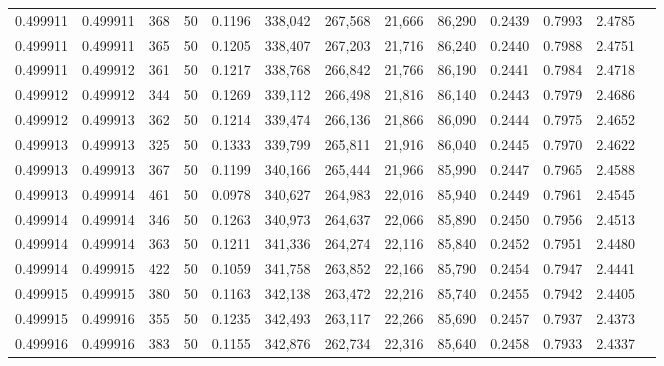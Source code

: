 \begin{tabular}{rrrrrrrrrrrrr}
0.499911 & 0.499911 &   368 &  50 &                                     0.1196 & 338,042 & 267,568 &  21,666 &  86,290 & 0.2439 & 0.7993 & 2.4785 \\
0.499911 & 0.499911 &   365 &  50 &                                     0.1205 & 338,407 & 267,203 &  21,716 &  86,240 & 0.2440 & 0.7988 & 2.4751 \\
0.499911 & 0.499912 &   361 &  50 &                                     0.1217 & 338,768 & 266,842 &  21,766 &  86,190 & 0.2441 & 0.7984 & 2.4718 \\
0.499912 & 0.499912 &   344 &  50 &                                     0.1269 & 339,112 & 266,498 &  21,816 &  86,140 & 0.2443 & 0.7979 & 2.4686 \\
0.499912 & 0.499913 &   362 &  50 &                                     0.1214 & 339,474 & 266,136 &  21,866 &  86,090 & 0.2444 & 0.7975 & 2.4652 \\
0.499913 & 0.499913 &   325 &  50 &                                     0.1333 & 339,799 & 265,811 &  21,916 &  86,040 & 0.2445 & 0.7970 & 2.4622 \\
0.499913 & 0.499913 &   367 &  50 &                                     0.1199 & 340,166 & 265,444 &  21,966 &  85,990 & 0.2447 & 0.7965 & 2.4588 \\
0.499913 & 0.499914 &   461 &  50 &                                     0.0978 & 340,627 & 264,983 &  22,016 &  85,940 & 0.2449 & 0.7961 & 2.4545 \\
0.499914 & 0.499914 &   346 &  50 &                                     0.1263 & 340,973 & 264,637 &  22,066 &  85,890 & 0.2450 & 0.7956 & 2.4513 \\
0.499914 & 0.499914 &   363 &  50 &                                     0.1211 & 341,336 & 264,274 &  22,116 &  85,840 & 0.2452 & 0.7951 & 2.4480 \\
0.499914 & 0.499915 &   422 &  50 &                                     0.1059 & 341,758 & 263,852 &  22,166 &  85,790 & 0.2454 & 0.7947 & 2.4441 \\
0.499915 & 0.499915 &   380 &  50 &                                     0.1163 & 342,138 & 263,472 &  22,216 &  85,740 & 0.2455 & 0.7942 & 2.4405 \\
0.499915 & 0.499916 &   355 &  50 &                                     0.1235 & 342,493 & 263,117 &  22,266 &  85,690 & 0.2457 & 0.7937 & 2.4373 \\
0.499916 & 0.499916 &   383 &  50 &                                     0.1155 & 342,876 & 262,734 &  22,316 &  85,640 & 0.2458 & 0.7933 & 2.4337 \\

\end{tabular}
